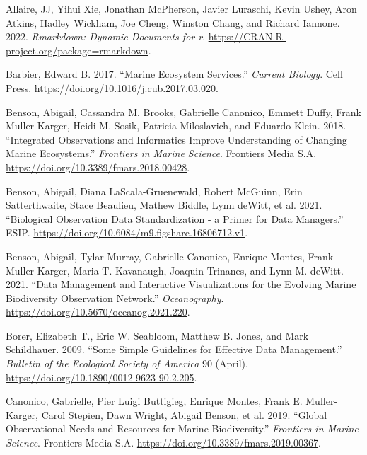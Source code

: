 \documentclass[
]{book}
\newlength{\cslhangindent}
\newlength{\cslentryspacingunit} %
\newenvironment{CSLReferences}[2] %
 {%
  \setlength{\parindent}{0pt}
  \ifodd #1
  \let\oldpar\par
  \def\par{\hangindent=\cslhangindent\oldpar}
  \fi
  \setlength{\parskip}{#2\cslentryspacingunit}
 }%
 {}
\begin{document}
\hypertarget{refs}{}
\begin{CSLReferences}{1}{0}
\leavevmode{}%
Allaire, JJ, Yihui Xie, Jonathan McPherson, Javier Luraschi, Kevin Ushey, Aron Atkins, Hadley Wickham, Joe Cheng, Winston Chang, and Richard Iannone. 2022. \emph{Rmarkdown: Dynamic Documents for r}. \url{https://CRAN.R-project.org/package=rmarkdown}.

\leavevmode{}%
Barbier, Edward B. 2017. {``Marine Ecosystem Services.''} \emph{Current Biology}. Cell Press. \url{https://doi.org/10.1016/j.cub.2017.03.020}.

\leavevmode{}%
Benson, Abigail, Cassandra M. Brooks, Gabrielle Canonico, Emmett Duffy, Frank Muller-Karger, Heidi M. Sosik, Patricia Miloslavich, and Eduardo Klein. 2018. {``Integrated Observations and Informatics Improve Understanding of Changing Marine Ecosystems.''} \emph{Frontiers in Marine Science}. Frontiers Media S.A. \url{https://doi.org/10.3389/fmars.2018.00428}.

\leavevmode{}%
Benson, Abigail, Diana LaScala-Gruenewald, Robert McGuinn, Erin Satterthwaite, Stace Beaulieu, Mathew Biddle, Lynn deWitt, et al. 2021. {``Biological Observation Data Standardization - a Primer for Data Managers.''} ESIP. \url{https://doi.org/10.6084/m9.figshare.16806712.v1}.

\leavevmode{}%
Benson, Abigail, Tylar Murray, Gabrielle Canonico, Enrique Montes, Frank Muller-Karger, Maria T. Kavanaugh, Joaquin Trinanes, and Lynn M. deWitt. 2021. {``Data Management and Interactive Visualizations for the Evolving Marine Biodiversity Observation Network.''} \emph{Oceanography}. \url{https://doi.org/10.5670/oceanog.2021.220}.

\leavevmode{}%
Borer, Elizabeth T., Eric W. Seabloom, Matthew B. Jones, and Mark Schildhauer. 2009. {``Some Simple Guidelines for Effective Data Management.''} \emph{Bulletin of the Ecological Society of America} 90 (April). \url{https://doi.org/10.1890/0012-9623-90.2.205}.

\leavevmode{}%
Canonico, Gabrielle, Pier Luigi Buttigieg, Enrique Montes, Frank E. Muller-Karger, Carol Stepien, Dawn Wright, Abigail Benson, et al. 2019. {``Global Observational Needs and Resources for Marine Biodiversity.''} \emph{Frontiers in Marine Science}. Frontiers Media S.A. \url{https://doi.org/10.3389/fmars.2019.00367}.


\end{CSLReferences}
\end{document}
